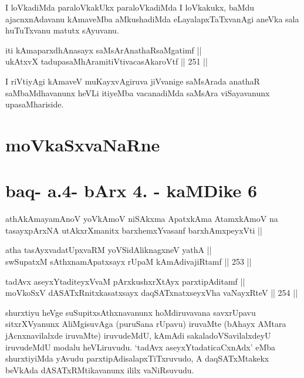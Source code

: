 \begin{artha}
I loVkadiMda paraloVkakUkx paraloVkadiMda I loVkakukx, baMdu
ajacnxnAdavanu kAmaveMba aMkushadiMda eLayalapxTaTxvanAgi aneVka sala
huTuTxvanu matutx sAyuvanu.
\end{artha}

\begin{shl}
iti kAmaparxdhAnasayx saMsArAnathaRsaMgatimf || \\
ukAtxvX tadupasaMhAramitiVtivacasA\s karoVtf ||  251 ||  
\end{shl}

\begin{artha}
I riVtiyAgi kAmaveV muKayxvAgiruva jiVvanige saMsArada anathaR
saMbaMdhavanunx heVLi itiyeMba vacanadiMda saMsAra viSayavanunx
upasaMhariside.
\end{artha}

\section*{moVkaSxvaNaRne}

\section*{baq- a.4- bArx 4. - kaMDike 6}

\begin{shl}
athAkAmayamAnoV yoV\s kAmoV niSAkxma ApatxkAma AtamxkAmoV na tasayxpArxNA utAkxrXmanitx barxhemxYvasanf barxhAmxpeyxVti ||
\end{shl}


\begin{shl}
atha tasAyxvadatUpxvaRM yoVSidAliknagxneV yathA || \\
swSupatxM sAthxnamApatxsayx rUpaM kAmAdivajiRtamf ||  253 ||  
\end{shl}

\begin{shl}
tadAvx aseyxYtaditeyxVvaM pArxkushxrXtAyx parxtipAditamf || \\
moVkoSxV dASATxRnitxkasatxsayx daqSATxnatxseyxVha vaNayxRteV ||  254 ||   
\end{shl}

\begin{artha}
shurxtiyu heVge suSupitxsAthxnavanunx hoMdiruvavana savxrUpavu
sitxrXVyanunx AliMgisuvAga (puruSana rUpavu) iruvaMte (bAhayx AMtara
jAcnxnavilalxde iruvaMte) iruvudeMdU, kAmAdi sakaladoVSavilalxdeyU
iruvudeMdU modalu heVLiruvudu. `tadAvx aseyxYtadaticaCxnAdx' eMba shurxtiyiMda yAvudu
parxtipAdisalapxTiTxruvudo, A daqSATxMtakekx beVkAda dASATxRMtikavanunx ililx vaNiRsuvudu.
\end{artha}

